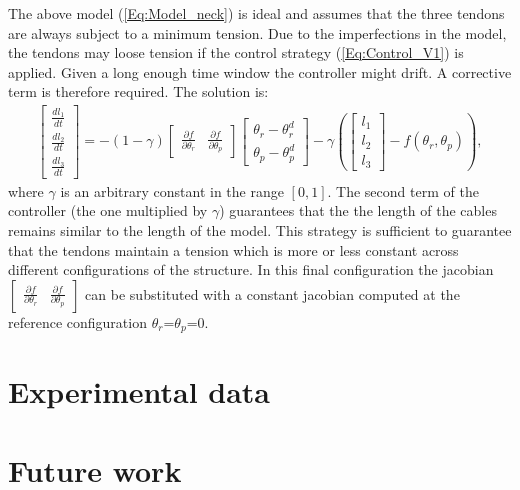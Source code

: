\documentclass[9pt]{amsart}
\theoremstyle{definition}
\theoremstyle{remark}
\numberwithin{equation}{section}
\begin{document}
The above model (\ref{Eq:Model_neck}) is ideal and assumes that the three tendons are always subject to a minimum tension. Due to the imperfections in the model, the tendons may loose tension if the control strategy (\ref{Eq:Control_V1}) is applied. Given a long enough time window the controller might drift. A corrective term is therefore required. The solution is:
\begin{eqnarray} \label{Eq:Control_V2}
\begin{bmatrix}
\frac{d l_1}{dt}\\
\frac{d l_2}{dt}\\
\frac{d l_3}{dt}
\end{bmatrix} = -(1-\gamma)\begin{bmatrix} \frac{\partial f} {\partial \theta_r} &  \frac{\partial f} {\partial \theta_p} \end{bmatrix}
 \begin{bmatrix}
\theta_r - \theta_r^d\\
\theta_p - \theta_p^d
\end{bmatrix} - \gamma \left( \begin{bmatrix} l_1\\
l_2\\
l_3
\end{bmatrix} - f(\theta_r, \theta_p) \right),
\end{eqnarray}
where $\gamma$ is an arbitrary constant in the range $[0, 1]$. The second term of the controller (the one multiplied by $\gamma$) guarantees that the the length of the cables remains similar to the length of the model. This strategy is sufficient to guarantee that the tendons maintain a tension which is more or less constant across different configurations of the structure. In this final configuration the jacobian $\begin{bmatrix} \frac{\partial f} {\partial \theta_r} &  \frac{\partial f} {\partial \theta_p} \end{bmatrix}$ can be substituted with a constant jacobian computed at the reference configuration $\theta_r$=$\theta_p$=0.


\section{Experimental data} \label{Sec:ExpData}


\section{Future work} \label{Sec:FutureWork}
\end{document}
